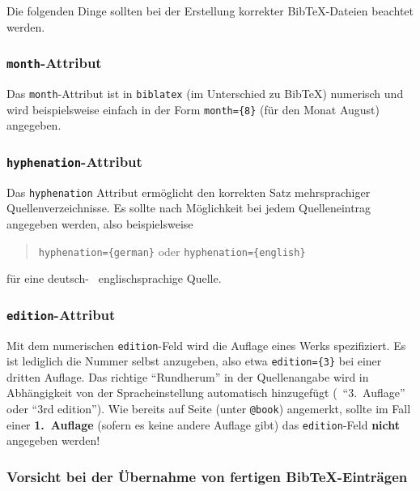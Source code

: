Die folgenden Dinge sollten bei der Erstellung korrekter BibTeX-Dateien beachtet werden.

\subsubsection{\texttt{month}-Attribut}

Das \texttt{month}-Attribut ist in \texttt{biblatex} (im Unterschied zu BibTeX) numerisch
und wird beispielsweise einfach in der Form \verb!month={8}! (für den Monat August)
angegeben.


\subsubsection{\texttt{hyphenation}-Attribut}

Das \texttt{hyphenation} Attribut ermöglicht den korrekten Satz mehrsprachiger Quellenverzeichnisse. 
Es sollte nach Möglichkeit bei jedem Quelleneintrag angegeben werden, also beispielsweise
\begin{quote}
\verb!hyphenation={german}! \quad oder \quad \verb!hyphenation={english}!
\end{quote}
für eine deutsch- \bzw\ englischsprachige Quelle.


\subsubsection{\texttt{edition}-Attribut}

Mit dem numerischen \texttt{edition}-Feld wird die Auflage eines Werks spezifiziert.
Es ist lediglich die Nummer selbst anzugeben, also etwa
\verb!edition={3}!
bei einer dritten Auflage. Das richtige "`Rundherum"' in der Quellenangabe wird 
in Abhängigkeit von der Spracheinstellung automatisch hinzugefügt 
(\zB\ "`3.\ Auflage"' oder "`3rd edition"').
%
Wie bereits auf Seite \pageref{sec:@book} (unter \texttt{@book}) angemerkt, sollte im Fall einer
\textbf{1.~Auflage} (sofern es keine andere Auflage gibt) das \texttt{edition}-Feld \textbf{nicht} 
angegeben werden!


\subsubsection{Vorsicht bei der Übernahme von fertigen BibTeX-Einträgen}

